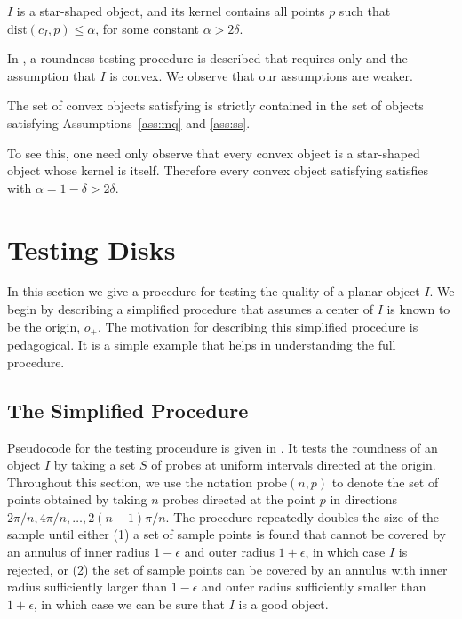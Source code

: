 \documentclass[11pt]{article}
\newcommand{\origin}{o_+}
\newcommand{\dist}{\mathrm{dist}}
\newcommand{\probe}{\mathrm{probe}}
\begin{document}
\begin{ass}
$I$ is a star-shaped object, and its kernel contains all points $p$
such that $\dist(c_I,p)\le\alpha$, for some constant $\alpha>2\delta$.
\end{ass}

In \cite{msy97,sy95}, a roundness testing procedure is described that
requires only  and the assumption that $I$ is convex.  We
observe that our assumptions are weaker.

\begin{obs}
The set of convex objects satisfying  is strictly contained
in the set of objects satisfying Assumptions~\ref{ass:mq} and
\ref{ass:ss}.
\end{obs}

To see this, one need only observe that every convex object is a
star-shaped object whose kernel is itself.  Therefore every convex
object satisfying  satisfies  with
$\alpha=1-\delta > 2\delta$.

\section{Testing Disks}

In this section we give a procedure for testing the quality of a
planar object $I$.  We begin by describing a simplified procedure that
assumes a center of $I$ is known to be the origin, $\origin$.  The
motivation for describing this simplified procedure is pedagogical.
It is a simple example that helps in understanding the full
procedure.

\subsection{The Simplified Procedure}

Pseudocode for the testing proceudure is given in
.  It tests the roundness of an object $I$ by
taking a set $S$ of probes at uniform intervals directed at the
origin.  Throughout this section, we use the notation $\probe(n,p)$ to
denote the set of points obtained by taking $n$ probes directed at the
point $p$ in directions $2\pi/n,4\pi/n,\ldots,2(n-1)\pi/n$.  The
procedure repeatedly doubles the size of the sample until either (1) a
set of sample points is found that cannot be covered by an annulus of
inner radius $1-\epsilon$ and outer radius $1+\epsilon$, in which case
$I$ is rejected, or (2) the set of sample points can be covered by an
annulus with inner radius sufficiently larger than $1-\epsilon$ and
outer radius sufficiently smaller than $1+\epsilon$, in which case we
can be sure that $I$ is a good object.
\end{document}
